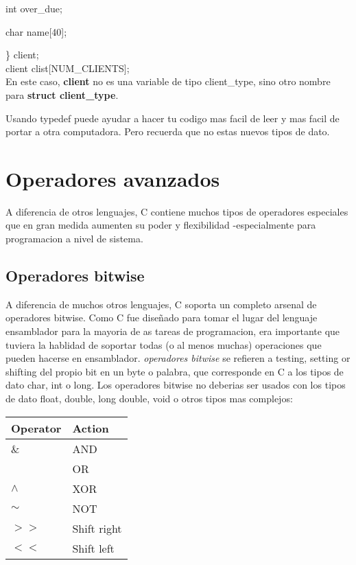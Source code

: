 \documentclass[]{article}
\begin{document}
			int over\_due;
			
			char name[40];
			
			\} client;\\
			
			client clist[NUM\_CLIENTS];\\
			
			En este caso, \textbf{client} no es una variable de tipo client\_type, sino otro nombre para \textbf{struct client\_type}.
			
			Usando typedef puede ayudar a hacer tu codigo mas facil de leer y mas facil de portar a otra computadora. Pero recuerda que no estas nuevos tipos de dato.
			
		\section{Operadores avanzados}
		
		A diferencia de otros lenguajes, C contiene muchos tipos de operadores especiales que en gran medida aumenten su poder y flexibilidad -especialmente para programacion a nivel de sistema.
		
			\subsection{Operadores bitwise}
			
			A diferencia de muchos otros lenguajes, C soporta un completo arsenal de operadores bitwise. Como C fue diseñado para tomar el lugar del lenguaje ensamblador para la mayoria de as tareas de programacion, era importante que tuviera la hablidad de soportar todas (o al menos muchas) operaciones que pueden hacerse en ensamblador. \textit{operadores bitwise} se refieren a testing, setting or shifting del propio bit en un byte o palabra, que corresponde en C a los tipos de dato char, int o long. Los operadores bitwise no deberias ser usados con los tipos de dato float, double, long double, void o otros tipos mas complejos:\\
			
			\begin{tabular}{l|l}
				\textbf{Operator} & \textbf{Action}\\
				\hline
				\& & AND\\
				\textbrokenbar & OR\\
				$\wedge$ & XOR\\
				$\sim$ & NOT\\
				$>>$ & Shift right\\
				$<<$ & Shift left
			\end{tabular}\\
		
\end{document}
